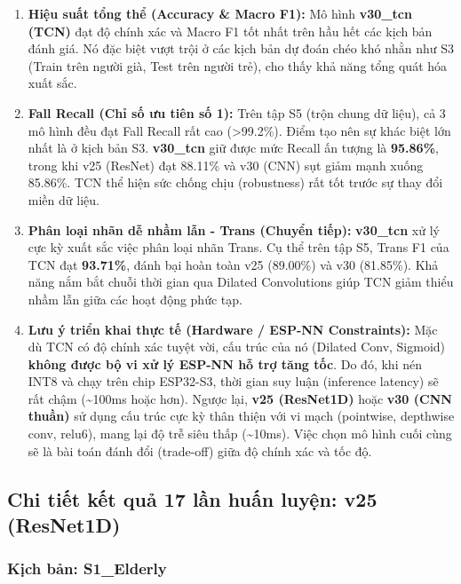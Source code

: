 \documentclass[12pt,a4paper]{article}
\begin{document}
\begin{enumerate}
\def\labelenumi{\arabic{enumi}.}
\item
  \textbf{Hiệu suất tổng thể (Accuracy \& Macro F1):} Mô hình
  \textbf{v30\_tcn (TCN)} đạt độ chính xác và Macro F1 tốt nhất trên hầu
  hết các kịch bản đánh giá. Nó đặc biệt vượt trội ở các kịch bản dự
  đoán chéo khó nhằn như S3 (Train trên người già, Test trên người trẻ),
  cho thấy khả năng tổng quát hóa xuất sắc.
\item
  \textbf{Fall Recall (Chỉ số ưu tiên số 1):} Trên tập S5 (trộn chung dữ
  liệu), cả 3 mô hình đều đạt Fall Recall rất cao (\textgreater99.2\%).
  Điểm tạo nên sự khác biệt lớn nhất là ở kịch bản S3. \textbf{v30\_tcn}
  giữ được mức Recall ấn tượng là \textbf{95.86\%}, trong khi v25
  (ResNet) đạt 88.11\% và v30 (CNN) sụt giảm mạnh xuống 85.86\%. TCN thể
  hiện sức chống chịu (robustness) rất tốt trước sự thay đổi miền dữ
  liệu.
\item
  \textbf{Phân loại nhãn dễ nhầm lẫn - Trans (Chuyển tiếp):}
  \textbf{v30\_tcn} xử lý cực kỳ xuất sắc việc phân loại nhãn Trans. Cụ
  thể trên tập S5, Trans F1 của TCN đạt \textbf{93.71\%}, đánh bại hoàn
  toàn v25 (89.00\%) và v30 (81.85\%). Khả năng nắm bắt chuỗi thời gian
  qua Dilated Convolutions giúp TCN giảm thiểu nhầm lẫn giữa các hoạt
  động phức tạp.
\item
  \textbf{Lưu ý triển khai thực tế (Hardware / ESP-NN Constraints):} Mặc
  dù TCN có độ chính xác tuyệt vời, cấu trúc của nó (Dilated Conv,
  Sigmoid) \textbf{không được bộ vi xử lý ESP-NN hỗ trợ tăng tốc}. Do
  đó, khi nén INT8 và chạy trên chip ESP32-S3, thời gian suy luận
  (inference latency) sẽ rất chậm (\textasciitilde100ms hoặc hơn). Ngược
  lại, \textbf{v25 (ResNet1D)} hoặc \textbf{v30 (CNN thuần)} sử dụng cấu
  trúc cực kỳ thân thiện với vi mạch (pointwise, depthwise conv, relu6),
  mang lại độ trễ siêu thấp (\textasciitilde10ms). Việc chọn mô hình
  cuối cùng sẽ là bài toán đánh đổi (trade-off) giữa độ chính xác và tốc
  độ.
\end{enumerate}

\subsection{Chi tiết kết quả 17 lần huấn luyện: v25
(ResNet1D)}\label{chi-tiux1ebft-kux1ebft-quux1ea3-17-lux1ea7n-huux1ea5n-luyux1ec7n-v25-resnet1d}

\subsubsection{Kịch bản:
S1\_Elderly}\label{kux1ecbch-bux1ea3n-s1_elderly}
\end{document}
